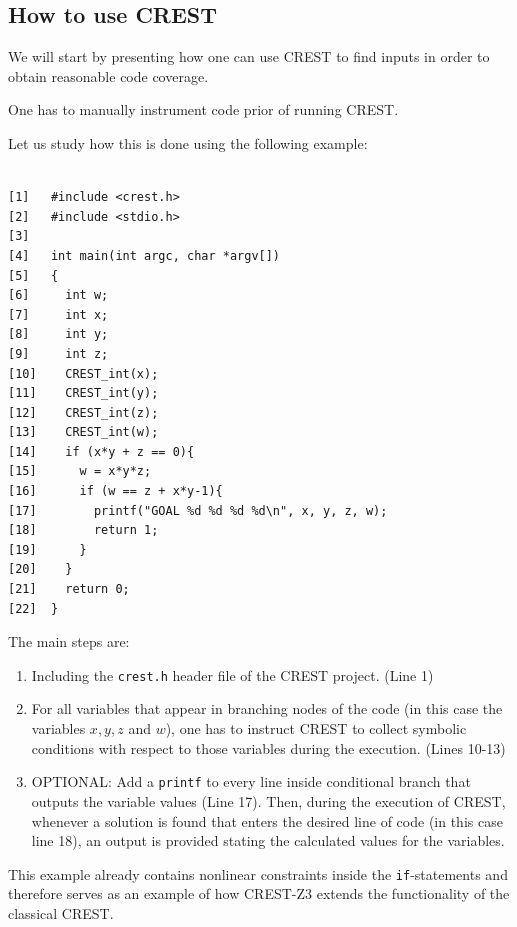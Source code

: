 \documentclass[oribibl, twocolumn]{llncs}
\begin{document}
\subsection{How to use \textsc{CREST}}
We will start by presenting how one can use \textsc{CREST} to find
inputs in order to obtain reasonable code coverage.

One has to manually instrument code prior of running \textsc{CREST}.

Let us study how this is done using the following example:

\begin{example}
\label{ex:codeForDemo}
\begin{verbatim}

[1]   #include <crest.h>
[2]   #include <stdio.h>
[3]  
[4]   int main(int argc, char *argv[])
[5]   {
[6]     int w;
[7]     int x;
[8]     int y;
[9]     int z;
[10]    CREST_int(x);
[11]    CREST_int(y);
[12]    CREST_int(z);
[13]    CREST_int(w);
[14]    if (x*y + z == 0){
[15]      w = x*y*z;
[16]      if (w == z + x*y-1){
[17]        printf("GOAL %d %d %d %d\n", x, y, z, w);
[18]        return 1;
[19]      }
[20]    }	
[21]    return 0;
[22]  }
\end{verbatim}
\end{example}

The main steps are:
\begin{enumerate}
  \item Including the \texttt{crest.h} header file of the
    \textsc{CREST} project. (Line 1)
   \item For all variables that appear in branching nodes of the code
     (in this case the variables $x,y,z$ and $w$), one has to instruct
     \textsc{CREST} to collect symbolic conditions with respect to
     those variables during the
     execution. (Lines 10-13)
   \item OPTIONAL: Add a
     \texttt{printf} to every line inside conditional branch that
     outputs the variable values (Line 17). Then, during the execution of
     \textsc{CREST}, whenever a solution is found that enters the
     desired line of code (in this case line 18), an output is
     provided stating the calculated values for the variables.
\end{enumerate}

\begin{remark}
  This example already contains nonlinear constraints inside the
  \texttt{if}-statements and therefore serves as an example of how
  \textsc{CREST-Z3} extends the functionality of the classical \textsc{CREST}.
\end{remark}
\end{document}
